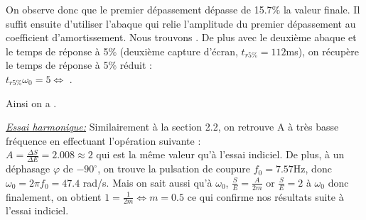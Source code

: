 \documentclass[12pt]{article}
\begin{document}
On observe donc que le premier dépassement dépasse de 15.7$\%$ la valeur finale. Il suffit ensuite d'utiliser l'abaque qui relie l'amplitude du premier dépassement au coefficient d'amortissement. Nous trouvons .
De plus avec le deuxième abaque et le temps de réponse à 5$\%$ (deuxième capture d'écran, $t_{r5\%} = 112$ms), on récupère le temps de réponse à 5$\%$ réduit :
\\ $t_{r5\%}\omega_0 = 5 \Leftrightarrow $ .
\begin{center}
    Ainsi on a .

\end{center}

\underline{\itshape Essai harmonique:} Similairement à la section 2.2, on retrouve A à très basse fréquence en effectuant l'opération suivante :
\\$A = \frac{\Delta S}{\Delta E} = 2.008 \approx 2$ qui est la même valeur qu'à l'essai indiciel. De plus, à un déphasage $\varphi$ de $-90^\circ$, on trouve la pulsation de coupure $f_0 = 7.57$Hz, donc $\omega_0 = 2\pi f_0 = 47.4$ rad/s.
Mais on sait aussi qu'à $\omega_0$, $\frac{S}{E} = \frac{A}{2m}$ or $\frac{S}{E} = 2$ à $\omega_0$ donc finalement, on obtient $1 = \frac{1}{2m} \Leftrightarrow m = 0.5$ ce qui confirme nos résultats suite à l'essai indiciel.
\end{document}
